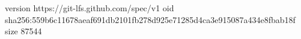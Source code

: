 version https://git-lfs.github.com/spec/v1
oid sha256:559b6c11678aeaf691db2101fb278d925e71285d4ca3e915087a434e8fbab18f
size 87544
